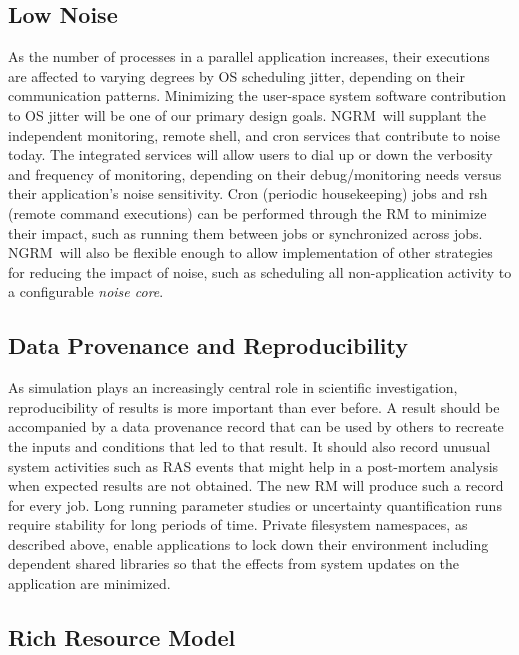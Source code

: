\documentclass{article}
\newcommand{\ngrm}{NGRM}
\begin{document}
\subsection{Low Noise}

As the number of processes in a parallel application increases, 
their executions are affected to varying degrees by OS
scheduling jitter, depending on their communication patterns. Minimizing
the user-space system software contribution to OS jitter will be one 
of our primary design goals.  \ngrm\ will supplant the independent monitoring, 
remote shell, and cron
services that contribute to noise today. The integrated services will
allow users to dial up or down the verbosity and frequency of monitoring,
depending on their debug/monitoring needs versus their application's noise
sensitivity. Cron (periodic housekeeping) jobs and rsh (remote command
executions) can be performed through the RM to minimize their impact,
such as running them between jobs or synchronized across jobs. 
\ngrm\ will also be flexible enough to allow implementation of other
strategies for reducing the impact of noise, such as scheduling all
non-application activity to a configurable {\em noise core}.


\subsection{Data Provenance and Reproducibility}

As simulation plays an increasingly central role in scientific
investigation, reproducibility of results is more important than ever
before. A result should be accompanied by a data provenance record that
can be used by others to recreate the inputs and conditions that led to
that result. It should also record unusual system activities 
such as RAS events that might help in a post-mortem analysis 
when expected results are not obtained.
The new RM will produce such a record for every job.
Long running parameter studies or uncertainty quantification runs
require stability for long periods of time. Private filesystem
namespaces, as described above, enable applications to lock down their
environment including dependent shared libraries so that the effects from
system updates on the application are minimized.

\subsection{Rich Resource Model}
\end{document}
